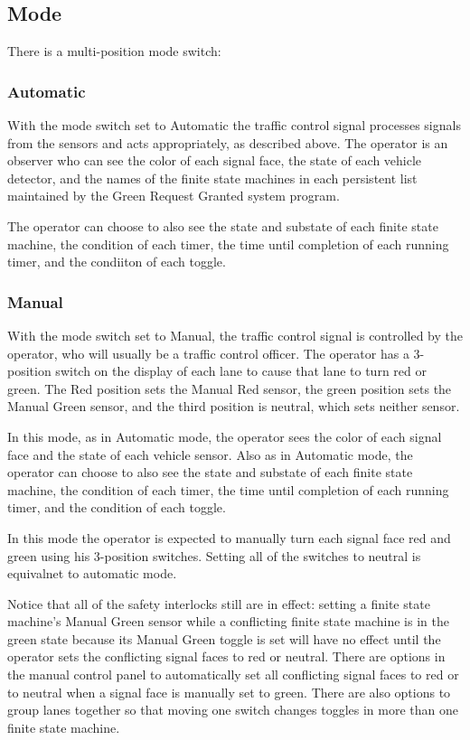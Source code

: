 \documentclass[letterpaper,twoside]{article}
\begin{document}
\subsection{Mode}

There is a multi-position mode switch:

\subsubsection{Automatic}

With the mode switch set to Automatic the traffic control signal
processes signals from the sensors and acts appropriately, as described
above.  The operator is an observer who can see the color of each
signal face, the state of each vehicle detector,
and the names of the finite state machines in each persistent list
maintained by the Green Request Granted system program.

The operator can choose to also see the state and substate of each
finite state machine, the condition of each timer, the time until completion
of each running timer, and the condiiton of each toggle.

\subsubsection{Manual}

With the mode switch set to Manual, the traffic control signal is
controlled by the operator, who will usually be a traffic control officer.
The operator has
a 3-position switch on the display of each lane to cause that lane to turn red
or green.  The Red position sets the Manual
Red sensor, the green position sets the Manual Green sensor, and
the third position is neutral, which sets neither sensor.

In this mode, as in Automatic mode, the operator sees the color of
each signal face and the state of each vehicle sensor.
Also as in Automatic mode,
the operator can choose to also see the state and substate of each
finite state machine, the condition of each timer, the time until completion
of each running timer, and the condition of each toggle.

In this mode the operator is expected to manually turn each signal face
red and green using his 3-position switches.  Setting all of the switches
to neutral is equivalnet to automatic mode.

Notice that all of the safety interlocks still
are in effect: setting a finite state machine's Manual Green sensor
while a conflicting finite state machine is in the green state
because its Manual Green toggle is set will have no effect until the
operator sets the conflicting signal faces to red or neutral.
There are options in the manual control panel to automatically set all
conflicting signal faces to red or to neutral when a signal face
is manually set to green.  There are also options to group lanes
together so that moving one switch changes toggles in
more than one finite state machine.
\end{document}
